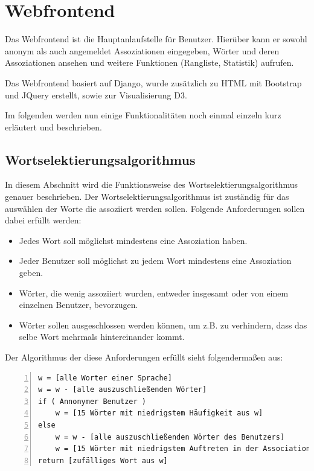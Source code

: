 \section{Webfrontend}
Das Webfrontend ist die Hauptanlaufstelle für Benutzer. Hierüber kann er sowohl anonym als auch angemeldet Assoziationen eingegeben, Wörter und
deren Assoziationen ansehen und weitere Funktionen (Rangliste, Statistik)
aufrufen.

Das Webfrontend basiert auf Django, wurde zusätzlich zu HTML mit Bootstrap und JQuery erstellt, sowie zur Visualisierung D3.

Im folgenden werden nun einige Funktionalitäten noch einmal einzeln kurz erläutert und beschrieben.

\subsection{Wortselektierungsalgorithmus}\label{subsec:wortselektierungsalgorithmus}
In diesem Abschnitt wird die Funktionsweise des Wortselektierungsalgorithmus genauer beschrieben. Der Wortselektierungsalgorithmus ist zuständig für das auswählen der Worte die assoziiert werden sollen. Folgende Anforderungen sollen dabei erfüllt werden:

\begin{itemize}
	\item Jedes Wort soll möglichst mindestens eine Assoziation haben.
	\item Jeder Benutzer soll möglichst zu jedem Wort mindestens eine Assoziation geben.
	\item Wörter, die wenig assoziiert wurden, entweder insgesamt oder von einem einzelnen Benutzer, bevorzugen.
	\item Wörter sollen ausgeschlossen werden können, um z.B. zu verhindern, dass das selbe Wort mehrmals hintereinander kommt.
\end{itemize}

Der Algorithmus der diese Anforderungen erfüllt sieht folgendermaßen aus:

\begin{lstlisting}[basicstyle=\ttfamily,
backgroundcolor=\color{lightgray},
showspaces=false,
showstringspaces=false,
showtabs=false,
columns=fixed,
frame=lines,
numbers=left,
numbersep=5pt,
breaklines=true,
captionpos=t,
caption=Wortselektierungsalgorithmus]
w = [alle Worter einer Sprache]
w = w - [alle auszuschließenden Wörter]
if ( Annonymer Benutzer )
    w = [15 Wörter mit niedrigstem Häufigkeit aus w]
else
    w = w - [alle auszuschließenden Wörter des Benutzers]
    w = [15 Wörter mit niedrigstem Auftreten in der AssociationHistory des Buntzers1 aus w]
return [zufälliges Wort aus w]
\end{lstlisting}

